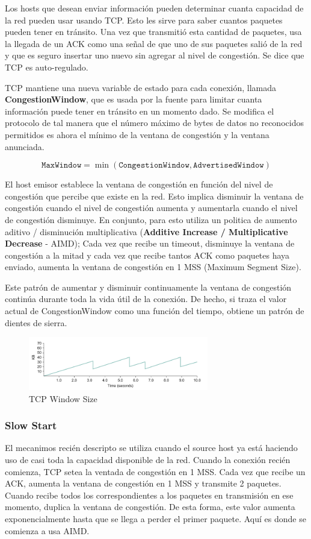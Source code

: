 Los hosts que desean enviar información pueden determinar cuanta capacidad de la red pueden usar usando TCP. Esto les sirve para saber cuantos paquetes pueden tener en tránsito. Una vez que transmitió esta cantidad de paquetes, usa la llegada de un ACK como una señal de que uno de sus paquetes salió de la red y que es seguro insertar uno nuevo sin agregar al nivel de congestión. Se dice que TCP es auto-regulado.

TCP mantiene una nueva variable de estado para cada conexión, llamada \textbf{CongestionWindow}, que es usada por la fuente para limitar cuanta información puede tener en tránsito en un momento dado. Se modifica el protocolo de tal manera que el número máximo de bytes de datos no reconocidos permitidos es ahora el mínimo de la ventana de congestión y la ventana anunciada.

\[\texttt{MaxWindow}= \min ( \texttt{CongestionWindow} , \texttt{AdvertisedWindow})\]

El host emisor establece la ventana de congestión en función del nivel de congestión que percibe que existe en la red. Esto implica disminuir la ventana de congestión cuando el nivel de congestión aumenta y aumentarla cuando el nivel de congestión disminuye. En conjunto, para esto utiliza un politica de aumento aditivo / disminución multiplicativa (\textbf{Additive Increase / Multiplicative Decrease} - AIMD); Cada vez que recibe un timeout, disminuye la ventana de congestión a la mitad y cada vez que recibe tantos ACK como paquetes haya enviado, aumenta la ventana de congestión en 1 MSS (Maximum Segment Size).

Este patrón de aumentar y disminuir continuamente la ventana de congestión continúa durante toda la vida útil de la conexión. De hecho, si traza el valor actual de CongestionWindow como una función del tiempo, obtiene un patrón de dientes de sierra.

\begin{figure}[H]
	\centering
	\includegraphics[width=0.7\textwidth
]{images/tcp-congestion.png}
	\caption[TCP Window Size]{TCP Window Size}
	\label{fig:tcp-congesiton}
\end{figure}

\subsubsection{Slow Start}
El mecanimos recién descripto se utiliza cuando el source host ya está haciendo uso de casi toda la capacidad disponible de la red. Cuando la conexión recién comienza, TCP setea la ventada de congestión en 1 MSS. Cada vez que recibe un ACK, aumenta la ventana de congestión en 1 MSS y transmite 2 paquetes. Cuando recibe todos los correspondientes a los paquetes en transmisión en ese momento, duplica la ventana de congestión. De esta forma, este valor aumenta exponencialmente hasta que se llega a perder el primer paquete. Aquí es donde se comienza a usa AIMD.

